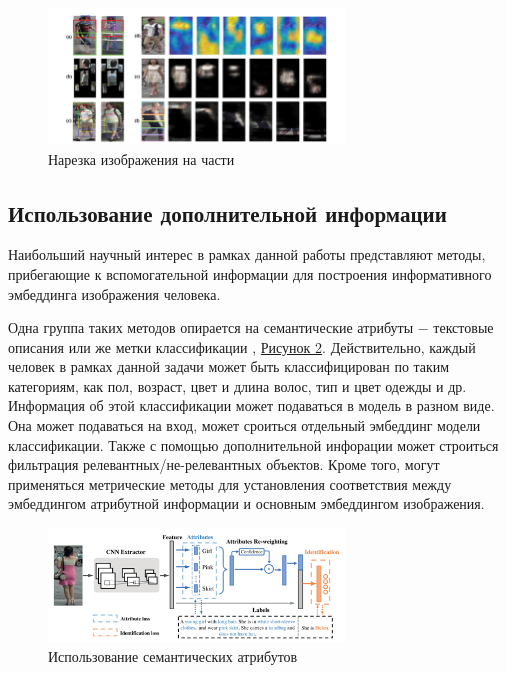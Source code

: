 \begin{figure}[ht]
     \centering
     \includegraphics[width=0.7\textwidth]{images/closed_world/image_slicing.png}
     \caption{Нарезка изображения на части \cite{su2018beyond}}
     \label{fig:image_slicing}
 \end{figure}

 \subsection{Использование дополнительной информации}

 Наибольший научный интерес в рамках данной работы представляют методы, прибегающие к вспомогательной информации для построения информативного эмбеддинга изображения человека. 

 Одна группа таких методов опирается на семантические атрибуты $-$ текстовые описания или же метки классификации \cite{lin2019improving}, \hyperref[fig:semantic_attributes]{Рисунок \ref*{fig:semantic_attributes}}. Действительно, каждый человек в рамках данной задачи может быть классифицирован по таким категориям, как пол, возраст, цвет и длина волос, тип и цвет одежды и др. Информация об этой классификации может подаваться в модель в разном виде. Она может подаваться на вход, может сроиться отдельный эмбеддинг модели классификации. Также с помощью дополнительной инфорации может строиться фильтрация релевантных/не-релевантных объектов. Кроме того, могут применяться метрические методы для установления соответствия между эмбеддингом атрибутной информации и основным эмбеддингом изображения.

 \begin{figure}[ht]
     \centering
     \includegraphics[width=0.7\textwidth]{images/closed_world/semantic_attributes.png}
     \caption{Использование семантических атрибутов \cite{lin2019improving}}
     \label{fig:semantic_attributes}
 \end{figure}

